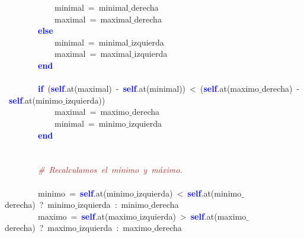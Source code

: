 \mbox{}\ \ \ \ \ \ \ \ \ \ \ \ minimal\ \textcolor{BrickRed}{=}\ minimal$\_$derecha \\
\mbox{}\ \ \ \ \ \ \ \ \ \ \ \ maximal\ \textcolor{BrickRed}{=}\ maximal$\_$derecha \\
\mbox{}\ \ \ \ \ \ \ \ \textbf{\textcolor{Blue}{else}}\  \\
\mbox{}\ \ \ \ \ \ \ \ \ \ \ \ minimal\ \textcolor{BrickRed}{=}\ minimal$\_$izquierda \\
\mbox{}\ \ \ \ \ \ \ \ \ \ \ \ maximal\ \textcolor{BrickRed}{=}\ maximal$\_$izquierda \\
\mbox{}\ \ \ \ \ \ \ \ \textbf{\textcolor{Blue}{end}}\  \\
\mbox{} \\
\mbox{}\ \ \ \ \ \ \ \ \textbf{\textcolor{Blue}{if}}\ \textcolor{BrickRed}{(}\textbf{\textcolor{Blue}{self}}\textcolor{BrickRed}{.}at\textcolor{BrickRed}{(}maximal\textcolor{BrickRed}{)}\ \textcolor{BrickRed}{-}\ \textbf{\textcolor{Blue}{self}}\textcolor{BrickRed}{.}at\textcolor{BrickRed}{(}minimal\textcolor{BrickRed}{))}\ \textcolor{BrickRed}{\textless{}}\ \textcolor{BrickRed}{(}\textbf{\textcolor{Blue}{self}}\textcolor{BrickRed}{.}at\textcolor{BrickRed}{(}maximo$\_$derecha\textcolor{BrickRed}{)}\ \textcolor{BrickRed}{-}\ \textbf{\textcolor{Blue}{self}}\textcolor{BrickRed}{.}at\textcolor{BrickRed}{(}minimo$\_$izquierda\textcolor{BrickRed}{))} \\
\mbox{}\ \ \ \ \ \ \ \ \ \ \ \ maximal\ \textcolor{BrickRed}{=}\ maximo$\_$derecha \\
\mbox{}\ \ \ \ \ \ \ \ \ \ \ \ minimal\ \textcolor{BrickRed}{=}\ minimo$\_$izquierda \\
\mbox{}\ \ \ \ \ \ \ \ \textbf{\textcolor{Blue}{end}} \\
\mbox{} \\
\mbox{}\ \ \ \ \ \ \ \  \\
\mbox{}\ \ \ \ \ \ \ \ \textit{\textcolor{Brown}{\#\ Recalculamos\ el\ mínimo\ y\ máximo.\ \ }} \\
\mbox{} \\
\mbox{}\ \ \ \ \ \ \ \ minimo\ \textcolor{BrickRed}{=}\ \textbf{\textcolor{Blue}{self}}\textcolor{BrickRed}{.}at\textcolor{BrickRed}{(}minimo$\_$izquierda\textcolor{BrickRed}{)}\ \textcolor{BrickRed}{\textless{}}\ \textbf{\textcolor{Blue}{self}}\textcolor{BrickRed}{.}at\textcolor{BrickRed}{(}minimo$\_$derecha\textcolor{BrickRed}{)}\ \textcolor{BrickRed}{?}\ minimo$\_$izquierda\ \textcolor{BrickRed}{:}\ minimo$\_$derecha \\
\mbox{}\ \ \ \ \ \ \ \ maximo\ \textcolor{BrickRed}{=}\ \textbf{\textcolor{Blue}{self}}\textcolor{BrickRed}{.}at\textcolor{BrickRed}{(}maximo$\_$izquierda\textcolor{BrickRed}{)}\ \textcolor{BrickRed}{\textgreater{}}\ \textbf{\textcolor{Blue}{self}}\textcolor{BrickRed}{.}at\textcolor{BrickRed}{(}maximo$\_$derecha\textcolor{BrickRed}{)}\ \textcolor{BrickRed}{?}\ maximo$\_$izquierda\ \textcolor{BrickRed}{:}\ maximo$\_$derecha \\
